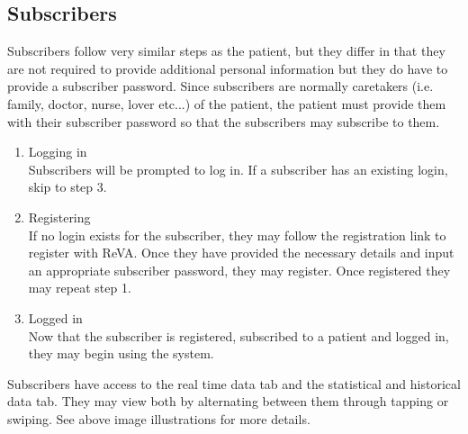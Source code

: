 \subsection{Subscribers} %
Subscribers follow very similar steps as the patient, but they differ in that they are not required to provide additional personal information but they do have to provide a subscriber password. Since subscribers are normally caretakers (i.e. family, doctor, nurse, lover etc...) of the patient, the patient must provide them with their subscriber password so that the subscribers may subscribe to them. 
\begin{enumerate}
	\item Logging in\\
		Subscribers will be prompted to log in. If a subscriber has an existing login, skip to step 3. 
	\item Registering\\
		If no login exists for the subscriber, they may follow the registration link to register with ReVA. Once they have 			provided the necessary details and input an appropriate subscriber password, they may register. Once registered they may 		 repeat step 1. 
	\item Logged in\\
		Now that the subscriber is registered, subscribed to a patient and logged in, they may begin using the system. 
\end{enumerate}
		
	Subscribers have access to the real time data tab and the statistical and historical data tab. They may view both by alternating between them through tapping or swiping. See above image illustrations for more details. 

